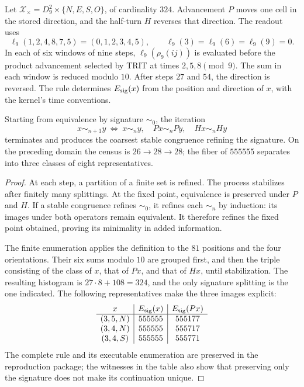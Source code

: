 \begin{definition}
\label{viii:def:firma555}
Let \(\mathcal X_\times=D_9^2\times\{N,E,S,O\}\), of cardinality \(324\).
Advancement \(P\) moves one cell in the stored direction, and the half-turn
\(H\) reverses that direction. The readout uses
\[
\ell_9(1,2,4,8,7,5)=(0,1,2,3,4,5),\qquad
\ell_9(3)=\ell_9(6)=\ell_9(9)=0.
\]
In each of six windows of nine steps,
\(\ell_9(\rho_9(ij))\) is evaluated before the product advancement selected by TRIT at
times \(2,5,8\pmod9\). The sum in each window is reduced modulo
\(10\). After steps \(27\) and \(54\), the direction is reversed.
The rule determines \(E_{\rm sig}(x)\) from the position and direction
of \(x\), with the kernel's time conventions.
\end{definition}

\begin{proposition}
\label{viii:prop:firma555}
Starting from equivalence by signature \(\sim_0\), the iteration
\[
x\sim_{n+1}y\ \Longleftrightarrow\
x\sim_n y,\quad Px\sim_n Py,\quad Hx\sim_n Hy
\]
terminates and produces the coarsest stable congruence refining the signature.
On the preceding domain the census is \(26\to28\to28\); the fiber of
\(555555\) separates into three classes of eight representatives.
\end{proposition}
\begin{proof}
At each step, a partition of a finite set is refined. The process
stabilizes after finitely many splittings. At the fixed point,
equivalence is preserved under \(P\) and \(H\). If a stable congruence
refines \(\sim_0\), it refines each \(\sim_n\) by induction: its images
under both operators remain equivalent. It therefore refines the fixed
point obtained, proving its minimality in added information.

The finite enumeration applies the definition to the \(81\) positions and the
four orientations. Their six sums modulo \(10\) are grouped first, and
then the triple consisting of the class of \(x\), that of \(Px\), and that of
\(Hx\), until stabilization. The resulting histogram is
\(27\cdot8+108=324\), and the only signature splitting is the one indicated.
The following representatives make the three images explicit:
\[
\begin{array}{c|c|c}
x&E_{\rm sig}(x)&E_{\rm sig}(Px)\\\hline
(3,5,N)&555555&555177\\
(3,4,N)&555555&555717\\
(3,4,S)&555555&555771
\end{array}
\]
The complete rule and its executable enumeration are preserved in the
reproduction package; the witnesses in the table also show that preserving
only the signature does not make its continuation unique.
\end{proof}

